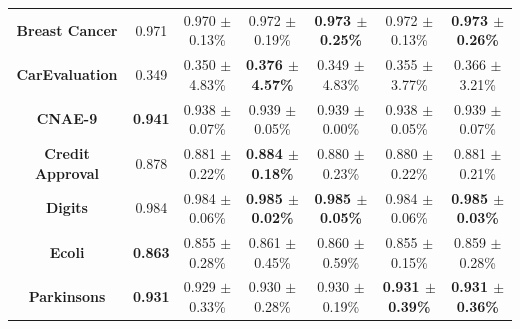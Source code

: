 \documentclass[iicol]{sn-jnl}
\theoremstyle{thmstyleone}%
\theoremstyle{thmstyletwo}%
\theoremstyle{thmstylethree}%
\begin{document}
\begin{table}
{\begin{tabular}{ccccccc}
\textbf{Breast Cancer}          & {\color[HTML]{FE0000} 0.971}          & 0.970 $\pm$ 0.13\%                                 & 0.972 $\pm$ 0.19\%                                 & \textbf{0.973 $\pm$ 0.25\%}                        & 0.972 $\pm$ 0.13\%                                 & \textbf{0.973 $\pm$ 0.26\%}                        \\
\textbf{CarEvaluation}          & 0.349                                 & 0.350 $\pm$ 4.83\%                                 & {\color[HTML]{FE0000} \textbf{0.376 $\pm$ 4.57\%}} & 0.349 $\pm$ 4.83\%                                 & 0.355 $\pm$ 3.77\%                                 & 0.366 $\pm$ 3.21\%                                 \\
\textbf{CNAE-9}                 & {\color[HTML]{FE0000} \textbf{0.941}} & 0.938 $\pm$ 0.07\%                                 & 0.939 $\pm$ 0.05\%                                 & 0.939 $\pm$ 0.00\%                                 & 0.938 $\pm$ 0.05\%                                 & 0.939 $\pm$ 0.07\%                                 \\
\textbf{Credit   Approval}      & 0.878                                 & 0.881 $\pm$ 0.22\%                                 & {\color[HTML]{FE0000} \textbf{0.884 $\pm$ 0.18\%}} & 0.880 $\pm$ 0.23\%                                 & 0.880 $\pm$ 0.22\%                                 & 0.881 $\pm$ 0.21\%                                 \\
\textbf{Digits}                 & 0.984                                 & 0.984 $\pm$ 0.06\%                                 & {\color[HTML]{FE0000} \textbf{0.985 $\pm$ 0.02\%}} & \textbf{0.985 $\pm$ 0.05\%}                        & 0.984 $\pm$ 0.06\%                                 & \textbf{0.985 $\pm$ 0.03\%}                        \\
\textbf{Ecoli}                  & {\color[HTML]{FE0000} \textbf{0.863}} & 0.855 $\pm$ 0.28\%                                 & 0.861 $\pm$ 0.45\%                                 & 0.860 $\pm$ 0.59\%                                 & 0.855 $\pm$ 0.15\%                                 & 0.859 $\pm$ 0.28\%                                 \\
\textbf{Parkinsons}             & {\color[HTML]{FE0000} \textbf{0.931}} & 0.929 $\pm$ 0.33\%                                 & 0.930 $\pm$ 0.28\%                                 & 0.930 $\pm$ 0.19\%                                 & \textbf{0.931 $\pm$ 0.39\%}                        & \textbf{0.931 $\pm$ 0.36\%}                        \\

\end{tabular}}
\end{table}
\end{document}
